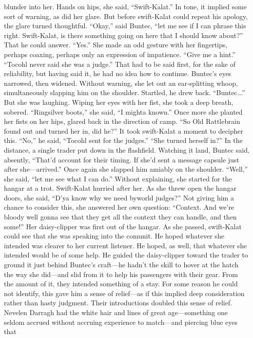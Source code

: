 \documentclass[9pt]{article}
\begin{document}
blunder into her.
Hands on hips, she said, “Swift-Kalat.” In tone, it implied some sort of warning, as did her glare. But
before swift-Kalat could repeat his apology, the glare turned thoughtful. “Okay,” said Buntec, “let me see
if I can phrase this right. Swift-Kalat, is there something going on here that I should know about?”
That he could answer. “Yes.”
She made an odd gesture with her fingertips, perhaps coaxing, perhaps only an expression of
impatience. “Give me a hint.”
“Tocohl never said she was a judge.” That had to be said first, for the sake of reliability, but having
said it, he had no idea how to continue.
Buntec’s eyes narrowed, then widened. Without warning, she let out an ear-splitting whoop,
simultaneously slapping him on the shoulder. Startled, he drew back. “Buntec...”
But she was laughing. Wiping her eyes with her fist, she took a deep breath, sobered. “Ringsilver
boots,” she said, “I mighta known.” Once more she planted her fists on her hips, glared back in the
direction of camp. “So Old Rattlebrain found out and turned her in, did he?”
It took swift-Kalat a moment to decipher this. “No,” he said, “Tocohl sent for the judges.”
“She turned herself in?” In the distance, a single trader put down in the flashfield. Watching it land,
Buntec said, absently, “That’d account for their timing. If she’d sent a message capsule just after
she—arrived.” Once again she slapped him amiably on the shoulder. “Well,” she said, “let me see what I
can do.” Without explaining, she started for the hangar at a trot.
Swift-Kalat hurried after her. As she threw open the hangar doors, she said, “D’ya know why we
need byworld judges?” Not giving him a chance to consider this, she answered her own question:
“Context. And we’re bloody well gonna see that they get all the context they can handle, and then
some!”
Her daisy-clipper was first out of the hangar. As she passed, swift-Kalat could see that she was
speaking into the comunit. He hoped whatever she intended was clearer to her current listener. He
hoped, as well, that whatever she intended would be of some help.
He guided the daisy-clipper toward the trader to ground it just behind Buntec’s craft—he hadn’t the
skill to hover at the hatch the way she did—and slid from it to help his passengers with their gear. From
the amount of it, they intended something of a stay. For some reason he could not identify, this gave him a
sense of relief—as if this implied deep consideration rather than hasty judgment.
Their introductions doubled this sense of relief. Nevelen Darragh had the white hair and lines of great
age—something one seldom accrued without accruing experience to match—and piercing blue eyes that
\end{document}
